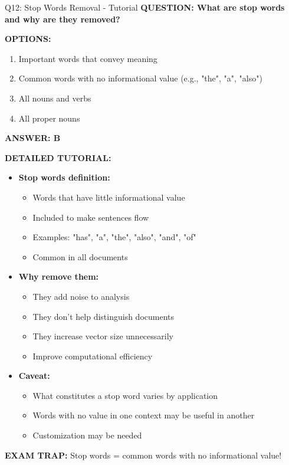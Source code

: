 \documentclass[8pt]{beamer}
\begin{document}
	\begin{frame}{Q12: Stop Words Removal - Tutorial}
		\fontsize{6.5}{7.5}\selectfont
		\textbf{QUESTION: What are stop words and why are they removed?}
		
		\vspace{0.1cm}
		\textbf{OPTIONS:}
		\begin{enumerate}
			\item Important words that convey meaning
			\item Common words with no informational value (e.g., "the", "a", "also")
			\item All nouns and verbs
			\item All proper nouns
		\end{enumerate}
		
		\vspace{0.1cm}
		\textcolor{myblue}{\textbf{ANSWER: B}}
		
		\vspace{0.1cm}
		\textbf{DETAILED TUTORIAL:}
		\begin{itemize}
			\item \textbf{Stop words definition:}
			\begin{itemize}
				\item Words that have little informational value
				\item Included to make sentences flow
				\item Examples: "has", "a", "the", "also", "and", "of"
				\item Common in all documents
			\end{itemize}
			\item \textbf{Why remove them:}
			\begin{itemize}
				\item They add noise to analysis
				\item They don't help distinguish documents
				\item They increase vector size unnecessarily
				\item Improve computational efficiency
			\end{itemize}
			\item \textbf{Caveat:}
			\begin{itemize}
				\item What constitutes a stop word varies by application
				\item Words with no value in one context may be useful in another
				\item Customization may be needed
			\end{itemize}
		\end{itemize}
		
		\textcolor{myred}{\textbf{EXAM TRAP:}} Stop words = \textcolor{myblue}{common words with no informational value}!
	\end{frame}
	
\end{document}
